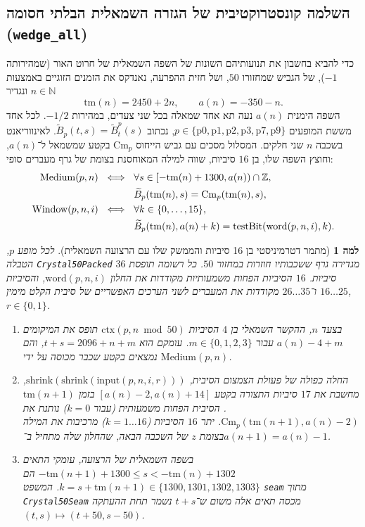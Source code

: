 \documentclass[11pt,a4paper]{article}
\DeclareRobustCommand{\textenglish}[1]{\foreignlanguage{english}{#1}}
\newtheorem{lemma}[theorem]{למה}
\theoremstyle{definition}
\begin{document}
\subsection{השלמה קונסטרוקטיבית של הגזרה השמאלית הבלתי חסומה (\textenglish{\texttt{wedge\_all}})}

כדי להביא בחשבון את תנועותיהם השונות של השפה השמאלית של חרוט האור (שמהירותה $-1$), של הגביש שמחזורו $50$, ושל חזית ההפרעה, נאנדקס את הזמנים הזוגיים באמצעות $n \in \mathbb{N}$ ונגדיר
\begin{equation}
\mathrm{tm}(n) = 2450 + 2n, \qquad a(n) = -350 - n.
\end{equation}
השפה הימנית $a(n)$ נעה תא אחד שמאלה בכל שני צעדים, במהירות $-1/2$. לכל אחד מששת המופעים $p \in \{\mathrm{p0}, \mathrm{p1}, \mathrm{p2}, \mathrm{p3}, \mathrm{p7}, \mathrm{p9}\}$, נכתוב $\widetilde B_p(t,s)=\widetilde B^p_t(s)$. לאינווריאנט בשכבה $n$ שני חלקים. המסלול מסכים עם גביש הייחוס $\mathrm{Cm}_p$ בקטע שמשמאל ל־$a(n)$, וחוצץ השפה שלו, בן $16$ סיביות, שווה למילה המאוחסנת בצומת של גרף מעברים סופי:
\begin{align}
\mathrm{Medium}(p,n)\ \iff\ {}&
\forall s\in[-\mathrm{tm}(n)+1300,a(n))\cap\mathbb{Z},\notag\\
&\widetilde B_p(\mathrm{tm}(n),s)=\mathrm{Cm}_p(\mathrm{tm}(n),s), \\
\mathrm{Window}(p,n,i)\ \iff\ {}&
\forall k\in\{0,\dots,15\},\notag\\
&\widetilde B_p(\mathrm{tm}(n),a(n)+k)=\mathrm{testBit}(\mathrm{word}(p,n,i),k).
\end{align}

\begin{lemma}[מתמר דטרמיניסטי בן 16 סיביות והממשק שלו עם הרצועה השמאלית]\label{lem:transducer}
לכל מופע $p$, הטבלה \textenglish{\texttt{Crystal50Packed}} מגדירה גרף ששכבותיו חוזרות במחזור $50$. כל רשומה תופסת $36$ סיביות. $16$ הסיביות הפחות משמעותיות מקודדות את החלון $\mathrm{word}(p, n, i)$, והסיביות $16\dots 25$ ו־$26\dots 35$ מקודדות את המעברים לשני הערכים האפשריים של סיבית הקלט מימין, $r \in \{0, 1\}$.
\begin{enumerate}[label=(\alph*)]
    \item בצעד $n$, ההקשר השמאלי בן $4$ הסיביות $\mathrm{ctx}(p, n \bmod 50)$ תופס את המיקומים $a(n) - 4 + m$ עבור $m \in \{0, 1, 2, 3\}$. עומקם הוא $t + s = 2096 + n + m$, והם נמצאים בקטע שכבר מכוסה על ידי $\mathrm{Medium}(p, n)$.
    \item החלה כפולה של פעולת הצמצום הסיבית, $\mathrm{shrink}(\mathrm{shrink}(\mathrm{input}(p, n, i, r)))$, מחשבת את $17$ סיביות התצורה בקטע $[a(n)-2, a(n)+14]$ בזמן $\mathrm{tm}(n+1)$. הסיבית הפחות משמעותית (עבור $k=0$) נותנת את $\mathrm{Cm}_p(\mathrm{tm}(n+1), a(n) - 2)$. יתר $16$ הסיביות ($k=1\dots 16$) מרכיבות את המילה בצומת $z$ של השכבה הבאה, שהחלון שלה מתחיל ב־$a(n+1) = a(n) - 1$.
    \item בשפה השמאלית של הרצועה, עומקי התאים $-\mathrm{tm}(n+1) + 1300 \le s < -\mathrm{tm}(n) + 1302$ הם $k = s + \mathrm{tm}(n+1) \in \{1300,1301,1302,1303\}$. המשפט \textenglish{\texttt{seam}} מתוך \textenglish{\texttt{Crystal50Seam}} מכסה תאים אלה משום ש־$t + s$ נשמר תחת ההעתקה $(t, s) \mapsto (t + 50, s - 50)$.
\end{enumerate}
\end{lemma}
\end{document}
